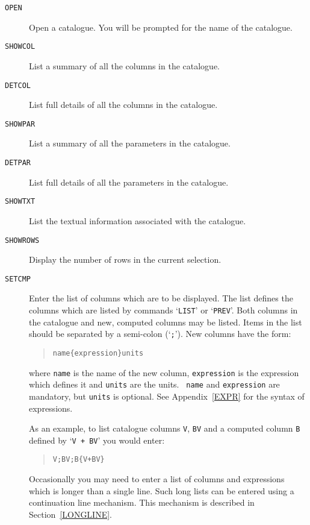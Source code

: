 \documentclass[twoside,11pt]{article}
\renewcommand{\_}{\texttt{\symbol{95}}}
\begin{document}
\begin{description}

  \item[ {\tt OPEN} ] Open a catalogue. You will be prompted for the
   name of the catalogue.

  \item[ {\tt SHOWCOL} ] List a summary of all the columns in the
   catalogue.

  \item[ {\tt DETCOL} ] List full details of all the columns in the
   catalogue.

  \item[ {\tt SHOWPAR} ] List a summary of all the parameters in the
   catalogue.

  \item[ {\tt DETPAR} ] List full details of all the parameters in the
   catalogue.

  \item[ {\tt SHOWTXT} ] List the textual information associated with
   the catalogue.

  \item[ {\tt SHOWROWS} ] Display the number of rows in the current
   selection.

  \item[ {\tt SETCMP} ] Enter the list of columns which are to be
   displayed.  The list defines the columns which are listed by commands
   `{\tt LIST}' or `{\tt PREV}'. Both columns in the catalogue and new,
   computed columns may be listed.  Items in the list should be separated
   by a semi-colon (`{\tt ;}').  New columns have the form:

  \begin{verse}
   {\tt name\{expression\}units}
  \end{verse}

   where {\tt name} is the name of the new column, {\tt expression} is
   the expression which defines it and {\tt units} are the units.  {\tt
   name} and {\tt expression} are mandatory, but {\tt units} is
   optional. See Appendix~\ref{EXPR} for the syntax of expressions.

   As an example, to list catalogue columns {\tt V}, {\tt B\_V} and a
   computed column {\tt B} defined by `{\tt V + B\_V}' you would enter:

  \begin{verse}
   {\tt V;B\_V;B\{V+B\_V\} }
  \end{verse}

   Occasionally you may need to enter a list of columns and expressions
   which is longer than a single line.  Such long lists can be entered
   using a continuation line mechanism.  This mechanism is described in
   Section~\ref{LONGLINE}.


\end{description}
\end{document}
